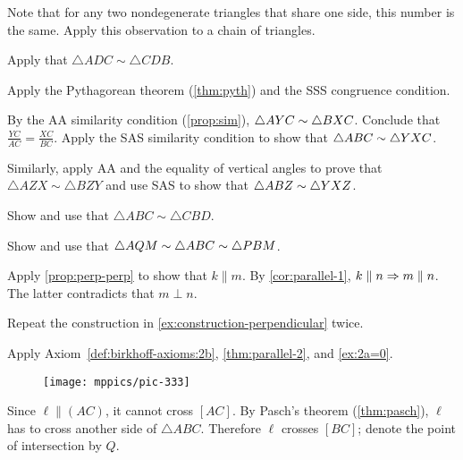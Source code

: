Note that for any two nondegenerate triangles that share one side, this number is the same.
Apply this observation to a chain of triangles.

Apply that $\triangle ADC\sim \triangle CDB$.

Apply the Pythagorean theorem (\ref{thm:pyth}) and the SSS congruence condition.

By the AA similarity condition (\ref{prop:sim}), $\triangle AYC\sim \triangle BXC$.
Conclude that 
$\frac{YC}{AC}=\frac{XC}{BC}$.
Apply the SAS similarity condition to show that $\triangle ABC\sim \triangle YXC$.

Similarly, apply AA and the equality of vertical angles to prove that $\triangle AZX\sim \triangle BZY$ and use SAS to show that $\triangle ABZ\sim \triangle YXZ$.

Show and use that $\triangle ABC\sim \triangle CBD$.

Show and use that $\triangle AQM\sim \triangle ABC\sim\triangle PBM$.


\setcounter{eqtn}{0}


Apply \ref{prop:perp-perp} to show that $k\parallel m$.
By \ref{cor:parallel-1}, $k\parallel n\Rightarrow m\parallel n$.
The latter contradicts that $m\perp n$.

Repeat the construction in \ref{ex:construction-perpendicular} twice.

Apply Axiom~\ref{def:birkhoff-axioms:2b}, \ref{thm:parallel-2}, and \ref{ex:2a=0}.

\begin{wrapfigure}{r}{23mm}
\vskip-0mm
\centering
\texttt{[image: mppics/pic-333]}
\end{wrapfigure}

Since  $\ell\parallel (AC)$, it cannot cross $[AC]$.
By Pasch's theorem (\ref{thm:pasch}), $\ell$ has to cross another side of $\triangle ABC$.
Therefore $\ell$ crosses $[BC]$; denote the point of intersection by $Q$.



